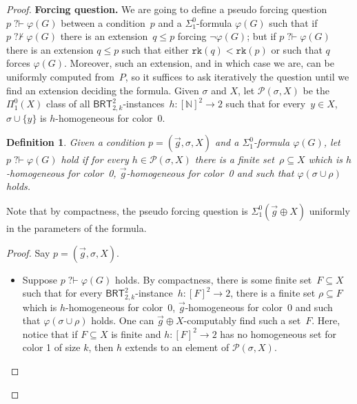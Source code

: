 \documentclass{article}
\def\P{\mathcal{P}}
\newcommand{\qvdash}{\operatorname{{?}{\vdash}}}
\newcommand{\nqvdash}{\operatorname{{?}{\nvdash}}}
\newcommand{\BRT}[0]{\mathsf{BRT}}
\newcommand{\NN}[0]{\mathbb{N}}
\newcommand{\rank}{\mathtt{rk}}
\numberwithin{theorem}{section}
\newtheorem{lemma}[theorem]{Lemma}
\newtheorem{definition}[theorem]{Definition}
\begin{document}
\begin{proof}
\noindent
\textbf{Forcing question.}
We are going to define a pseudo forcing question $p \qvdash \varphi(G)$ between a condition~$p$ and a $\Sigma^0_1$-formula $\varphi(G)$ such that if $p \nqvdash \varphi(G)$ there is an extension~$q \leq p$ forcing $\neg \varphi(G)$; but if $p \qvdash \varphi(G)$ there is an extension $q \leq p$ such that either $\rank(q) < \rank(p)$ or such that $q$ forces $\varphi(G)$. Moreover, such an extension, and in which case we are, can be uniformly computed from~$P$, so it suffices to ask iteratively the question until we find an extension deciding the formula.
Given $\sigma$ and $X$, let $\P(\sigma, X)$ be the $\Pi^0_1(X)$ class of all $\BRT^2_{2,k}$-instances~$h : [\NN]^2 \to 2$ such that for every~$y \in X$, $\sigma \cup \{y\}$ is $h$-homogeneous for color~0.

\begin{definition}
Given a condition $p = (\vec{g}, \sigma, X)$ and a $\Sigma^0_1$-formula $\varphi(G)$, let $p \qvdash \varphi(G)$ hold if for every $h \in \P(\sigma, X)$ there is a finite set~$\rho \subseteq X$ which is $h$-homogeneous for color~0, $\vec{g}$-homogeneous for color~0 and such that $\varphi(\sigma \cup \rho)$ holds.
\end{definition}

Note that by compactness, the pseudo forcing question is $\Sigma^0_1(\vec{g} \oplus X)$ uniformly in the parameters of the formula.

\begin{proof}
Say $p = (\vec{g}, \sigma, X)$.
\begin{itemize}
    \item[(i)] Suppose $p \qvdash \varphi(G)$ holds. By compactness, there is some finite set~$F \subseteq X$ such that for every $\BRT^2_{2,k}$-instance~$h : [F]^2 \to 2$, there is a finite set $\rho \subseteq F$ which is $h$-homogeneous for color~0, $\vec{g}$-homogeneous for color~0 and such that $\varphi(\sigma \cup \rho)$ holds.  One can $\vec{g} \oplus X$-computably find such a set~$F$.  Here, notice that if $F \subseteq X$ is finite and $h : [F]^2 \to 2$ has no homogeneous set for color 1 of size $k$, then $h$ extends to an element of $\P(\sigma, X)$.  
    

\end{itemize}
\end{proof}
\end{proof}
\end{document}
